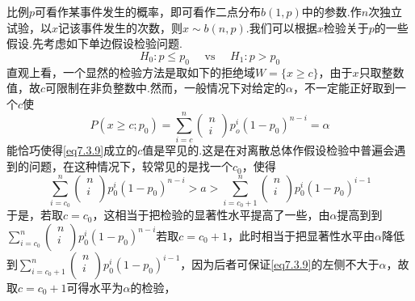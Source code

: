 比例$p$可看作某事件发生的概率，即可看作二点分布$b(1,p)$中的参数.作$n$次独立试验，以$x$记该事件发生的次数，则$x\sim b(n,p)$.我们可以根据$x$检验关于$p$的一些假设.先考虑如下单边假设检验问题.
\begin{equation}\label{eq7.3.8}
H _ { 0 } : p \leq p _ { 0 } \quad \text { vs } \quad H _ { 1 } : p > p _ { 0 }
\end{equation}
直观上看，一个显然的检验方法是取如下的拒绝域$W=\{x\geq c\}$，由于$x$只取整数值，故$c$可限制在非负整数中.然而，一般情况下对给定的$\alpha$，不一定能正好取到一个$c$使
	\begin{equation}\label{eq7.3.9}
	P \left( x \geq c ; p _ { 0 } \right) = \sum _ { i = c } ^ { n } \left( \begin{array} { l } { n } \\ { i } \end{array} \right) p _ { o } ^ { i } \left( 1 - p _ { 0 } \right) ^ { n - i } = \alpha
	\end{equation}
能恰巧使得\ref{eq7.3.9}成立的$c$值是罕见的.这是在对离散总体作假设检验中普遍会遇到的问题，在这种情况下，较常见的是找一个$c_{0}$，使得
\[\sum_{i=c_0}^n{\left(\begin{array}{l}
	n\\
	i\\
	\end{array}\right)}p_{0}^{i}\left(1-p_0\right)^{n-i}>a>\sum_{i=c_0+1}^n{\left(\begin{array}{c}
	n\\
	i\\
	\end{array}\right)}p_{0}^{i}\left(1-p_0\right)^{i-1}\]
于是，若取$c=c_{0}$，这相当于把检验的显著性水平提高了一些，由$\alpha$提高到到$\sum_{i=c_0}^n{\left(\begin{array}{l}
	n\\
	i\\
	\end{array}\right)}p_{0}^{i}\left(1-p_0\right)^{n-i}$若取$c=c_{0}+1$，此时相当于把显著性水平由$\alpha$降低到$\sum_{i=c_0+1}^n{\left(\begin{array}{c}
	n\\
	i\\
	\end{array}\right)}p_{0}^{i}\left(1-p_0\right)^{i-1}$，因为后者可保证\ref{eq7.3.9}的左侧不大于$\alpha$，故取$c=c_{0}+1$可得水平为$\alpha$的检验，

